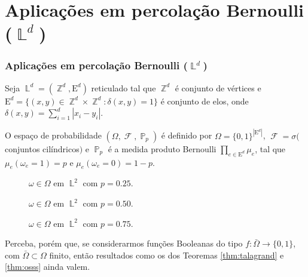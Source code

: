 \documentclass[9pt]{beamer}
\theoremstyle{definition} %
\DeclareMathOperator{\PX}{\mathbb{P}} %
\DeclareMathOperator{\FX}{\mathcal{F}} %
\DeclareMathOperator{\ZX}{\mathbb{Z}} %
\DeclareMathOperator{\LX}{\mathbb{L}} %
\begin{document}
	\section{Aplicações em percolação Bernoulli ($\LX^d$)}
	\begin{frame}[t]
		\frametitle{Aplicações em percolação Bernoulli ($\LX^d$)}
		Seja $\LX^d = (\ZX^d, \text{E}^d)$ reticulado tal que $\ZX^d$ é conjunto de vértices e $\text{E}^d = \{(x, y) \in \ZX^d \times \ZX^d : \delta(x, y) = 1\}$ é conjunto de elos, onde $\delta(x, y) = \sum_{i = 1}^{d} |x_i - y_i|$.
		\pause
		
		O espaço de probabilidade $(\Omega, \FX, \PX_p)$ é definido por $\Omega = \{0, 1\}^{|\text{E}^d|}$, $\FX = \sigma($conjuntos cilíndricos$)$ e $\PX_p$ é a medida produto Bernoulli $\prod_{e \in \text{E}^d} \mu_e$, tal que $\mu_e(\omega_e = 1) = p$ e $\mu_e(\omega_e = 0) = 1 - p$.
		\vspace{-3pt}	
		\begin{figure}
			\begin{overprint}
				\centering
				\centering
				\centering
			\end{overprint}
		\vspace{-9pt} 
			\begin{overprint}
				\caption{$\omega \in \Omega$ em $\LX^2$ com $p = 0.25$.}
				\caption{$\omega \in \Omega$ em $\LX^2$ com $p = 0.50$.}
				\caption{$\omega \in \Omega$ em $\LX^2$ com $p = 0.75$.}
			\end{overprint}
			\label{fig-reticulado}
		\end{figure}		
		\vspace{-12pt}
		\pause
		\pause
		\pause
		Perceba, porém que, se considerarmos funções Booleanas do tipo $f: \bar{\Omega} \to \{0, 1\}$, com $\bar{\Omega} \subset \Omega$ finito, então resultados como os dos Teoremas \ref{thm:talagrand} e \ref{thm:osss} ainda valem.
	\end{frame}
\end{document}

